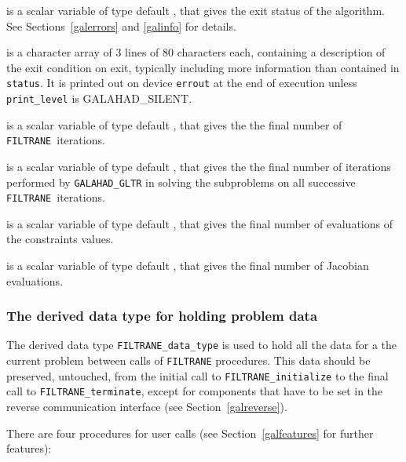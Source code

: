 \documentclass{galahad}
\newcommand{\packagename}{FILTRANE}
\newcommand{\sym}{\sf\small}
\newcommand{\filtrane}{{\tt \packagename}}
\begin{document}
\begin{description}

 is a scalar variable of type default \integer, that gives the
exit status of the algorithm. See Sections~\ref{galerrors} and \ref{galinfo}
for details.

 is a character array of 3 lines of 80 characters each, 
containing a description of the exit condition
on exit, typically including more information
than contained in {\tt status}.
It is printed out on device {\tt errout} at the end of execution
unless {\tt print\_level} is {\sym GALAHAD\_SILENT}.

 is a scalar variable of type default \integer, that
gives the the final number of \filtrane\ iterations.

 is a scalar variable of type default \integer, that
gives the the final number of iterations performed by {\tt GALAHAD\_GLTR} in
solving the subproblems on all successive \filtrane\ iterations.

 is a scalar variable of type default \integer, that
gives the final number of evaluations of the constraints values.

 is a scalar variable of type default \integer, that
gives the final number of Jacobian evaluations.
\end{description}


\subsubsection{The derived data type for holding problem data}\label{typedata}
The derived data type 
{\tt \packagename\_data\_type} 
is used to hold all the data for a the current problem between calls of 
{\tt \packagename} procedures. 
This data should be preserved, untouched, from the initial call to 
{\tt \packagename\_initialize}
to the final call to
{\tt \packagename\_terminate}, except for components that have to be set in
the reverse communication interface (see Section~\ref{galreverse}).


\galarguments
There are four procedures for user calls
(see Section~\ref{galfeatures} for further features): 
\end{document}
